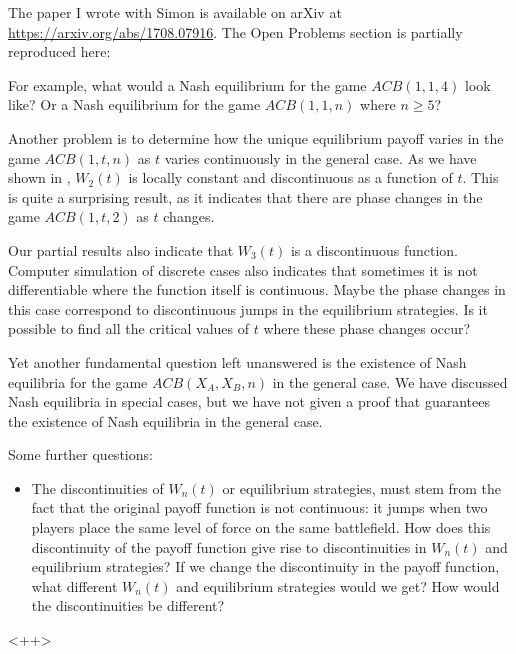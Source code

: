 \documentclass[12pt,oneside,reqno]{amsart}
\theoremstyle{definition}
\theoremstyle{remark}
\begin{document}
The paper I wrote with Simon is available on arXiv at \url{https://arxiv.org/abs/1708.07916}.
The Open Problems section is partially reproduced here:

For example, what would a Nash equilibrium for the game $ACB(1,1,4)$ look like? Or a Nash equilibrium for the game $ACB(1,1,n)$ where $n\ge 5$?

Another problem is to determine how the unique equilibrium payoff varies in the game $ACB(1,t,n)$ as $t$ varies continuously in the general case. As we have shown in , $W_2(t)$ is locally constant and discontinuous as a function of $t$. This is quite a surprising result, as it indicates that there are phase changes in the game $ACB(1,t,2)$ as $t$ changes.

Our partial results  also indicate that $W_3(t)$ is a discontinuous function. Computer simulation of discrete cases also indicates that sometimes it is not differentiable where the function itself is continuous. Maybe the phase changes in this case correspond to discontinuous jumps in the equilibrium strategies.
Is it possible to find all the critical values of $t$ where these phase changes occur?

Yet another fundamental question left unanswered is the existence of Nash equilibria for the game $ACB(X_A,X_B,n)$ in the general case. We have discussed Nash equilibria in special cases, but we have not given a proof that guarantees the existence of Nash equilibria in the general case.


Some further questions:
\begin{itemize}
  \item 
    The discontinuities of $W_n(t)$ or equilibrium strategies, must stem from the fact that the original payoff function is not continuous: it jumps when two players place the same level of force on the same battlefield. How does this discontinuity of the payoff function give rise to discontinuities in $W_n(t)$ and equilibrium strategies? If we change the discontinuity in the payoff function, what different $W_n(t)$ and equilibrium strategies would we get? How would the discontinuities be different?
\end{itemize}<++>
\end{document}
